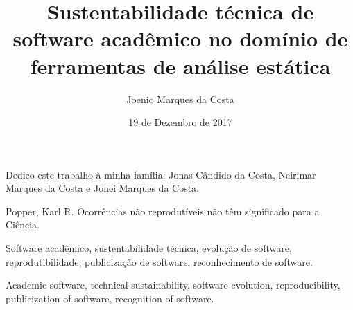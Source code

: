 \documentclass[msc, classic, a4paper]{ufbathesis}
\institute{Instituto de Matemática}
\date{19 de Dezembro de 2017}
\author{Joenio Marques da Costa}
\title{
  Sustentabilidade técnica de software acadêmico no domínio de ferramentas de
  análise estática
}
\begin{document}
\pgcompfrontpage
\frontmatter
\pgcomppresentationpage

\catalogingsheet


\begin{dedicatory}
Dedico este trabalho à minha família:
Jonas Cândido da Costa,
Neirimar Marques da Costa e
Jonei Marques da Costa.
\end{dedicatory}

\acknowledgements


\begin{epigraph}[1959]{Popper, Karl R.}
Ocorrências não reprodutíveis não têm significado para a Ciência.
\end{epigraph}

\resumo



\begin{keywords}
Software acadêmico, sustentabilidade técnica, evolução de software,
reprodutibilidade, publicização de software, reconhecimento de software.
\end{keywords}

\abstract



\begin{keywords}
Academic software, technical sustainability, software evolution,
reproducibility, publicization of software, recognition of software.
\end{keywords}

\tableofcontents
\listoffigures
\listoftables
\mainmatter

\end{document}
